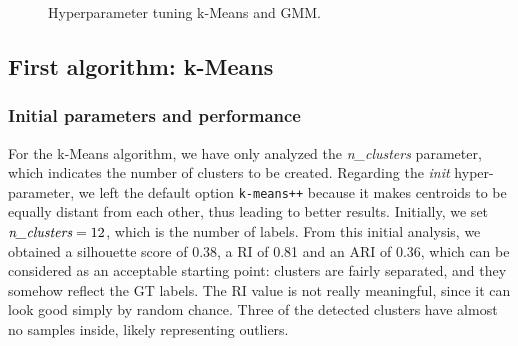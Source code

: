 \documentclass[acmlarge,nonacm]{acmart}
\begin{document}
\begin{figure}
	\centering
     \quad
     \quad   
  	\caption{Hyperparameter tuning k-Means and GMM.} 
    \label{fig:silhouettes}
\end{figure}

\subsection{First algorithm: k-Means}
\subsubsection{Initial parameters and performance}
For the k-Means algorithm, we have only analyzed the \emph{n\_clusters} parameter, which indicates the number of clusters to be created. Regarding the \emph{init} hyper-parameter, we left the default option \verb|k-means++| because it makes centroids to be equally distant from each other, thus leading to better results.
Initially, we set $\emph{n\_clusters}=12$, which is the number of labels.
From this initial analysis, we obtained a silhouette score of 0.38, a RI of 0.81 and an ARI of 0.36, which can be considered as an acceptable starting point: clusters are fairly separated, and they somehow reflect the GT labels. The RI value is not really meaningful, since it can look good simply by random chance. Three of the detected clusters have almost no samples inside, likely representing outliers.
\end{document}
